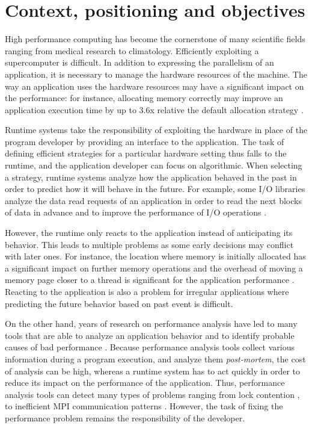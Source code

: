 \documentclass[a4paper,11pt,defblank]{article}
\begin{document}
\section{Context, positioning and objectives}

High performance computing has become the
cornerstone of many scientific fields ranging from medical research
to climatology.
%
Efficiently exploiting a supercomputer is difficult. In addition to
expressing the parallelism of an application, it is necessary to
manage the hardware resources of the machine. The way an application
uses the hardware resources may have a significant impact on the
performance: for instance, allocating memory correctly may improve an
application execution time by up to 3.6x relative the default allocation
strategy \cite{carrefour}.

Runtime systems take the responsibility of exploiting the hardware in
place of the program developer by providing an interface to the
application. The task of defining efficient strategies for a
particular hardware setting thus falls to the runtime, and the
application developer can focus on algorithmic.
%
When selecting a strategy, runtime systems analyze how the application
behaved in the past in order to predict how it will behave in the
future.
%
For example, some I/O libraries analyze the data read requests of an
application in order to read the next blocks of data in advance and to
improve the performance of I/O operations \cite{cao1996implementation,
  ding2007diskseen}.

However, the runtime only reacts to the application instead of
anticipating its behavior. This leads to multiple problems as some
early decisions may conflict with later ones. For instance, the
location where memory is initially allocated has a significant impact
on further memory operations and the overhead of moving a memory page
closer to a thread is significant for the application performance
\cite{broquedis2009dynamic}. Reacting to the application is also a
problem for irregular applications where predicting the future
behavior based on past event is difficult.

On the other hand, years of research on performance analysis have led
to many tools that are able to analyze an application behavior and to
identify probable causes of bad performance \cite{hpctoolkit,
  geimer2006scalable, kojak}. Because performance analysis tools
collect various information during a program execution, and analyze
them \emph{post-mortem}, the cost of analysis can be high, whereas a
runtime system has to act quickly in order to reduce its impact on the
performance of the application.  Thus, performance analysis tools can
detect many types of problems ranging from lock contention
\cite{lock_contention}, to inefficient MPI communication patterns
\cite{scalasca}. However, the task of fixing the performance problem
remains the responsibility of the developer.
\end{document}
